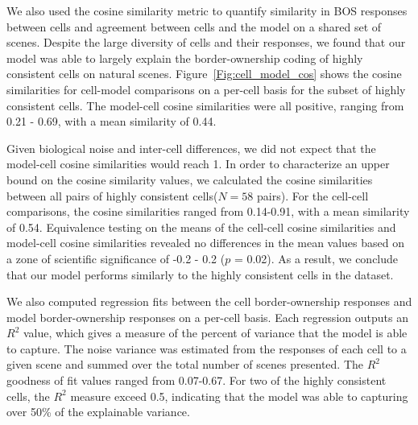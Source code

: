 \documentclass[12pt]{article}
\begin{document}
We also used the cosine similarity metric to quantify similarity in BOS responses between cells and agreement between cells and the model on a shared set of scenes. Despite the large diversity of cells and their responses, we found that our model was able to largely explain the border-ownership coding of highly consistent cells on natural scenes. Figure~\ref{Fig:cell_model_cos} shows the cosine similarities for cell-model comparisons on a per-cell basis for the subset of highly consistent cells. The model-cell cosine similarities were all positive, ranging from 0.21 - 0.69, with a mean similarity of 0.44.

Given biological noise and inter-cell differences, we did not expect that the model-cell cosine similarities would reach 1. In order to characterize an upper bound on the cosine similarity values, we calculated the cosine similarities between all pairs of highly consistent cells($N = 58$ pairs). For the cell-cell comparisons, the cosine similarities ranged from 0.14-0.91, with a mean similarity of 0.54. Equivalence testing on the means of the cell-cell cosine similarities and model-cell cosine similarities revealed no differences in the mean values based on a zone of scientific significance of -0.2 - 0.2 ($p$ = 0.02). As a result, we conclude that our model performs similarly to the highly consistent cells in the dataset.

We also computed regression fits between the cell border-ownership responses and model border-ownership responses on a per-cell basis. Each regression outputs an $R^2$ value, which gives a measure of the percent of variance that the model is able to capture. The noise variance was estimated from the responses of each cell to a given scene and summed over the total number of scenes presented. The $R^2$ goodness of fit values ranged from 0.07-0.67. For two of the highly consistent cells, the $R^2$ measure exceed 0.5, indicating that the model was able to capturing over 50\% of the explainable variance.
\end{document}
